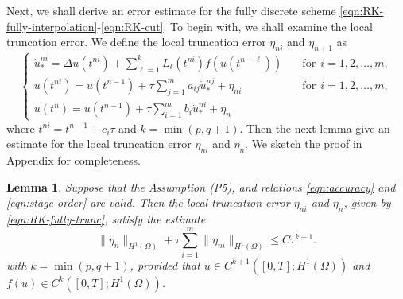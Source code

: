\documentclass[a4paper, oneside]{book}
\def\II{(\Omega)}
\newtheorem{lemma}{Lemma}[section]
\begin{document}
Next, we shall derive an error estimate for the fully discrete scheme \eqref{eqn:RK-fully-interpolation}-\eqref{eqn:RK-cut}.
To begin with, we shall examine the local truncation error. We define the local truncation error $\eta_{ni}$ and $\eta_{n+1}$  as
\begin{equation}\label{eqn:RK-fully-trunc}
    \begin{cases}
    \dot u_*^{ni} = \Delta  u(t^{ni}) +
    \sum_{\ell=1}^k L_{\ell}(t^{ni}) f(u(t^{n-\ell}))&\quad \text{for} ~~i=1,2,\dots,m, \\ %
    u(t^{ni})=  u(t^{n-1}) + \tau \sum_{j=1}^m a_{ij} \dot u_*^{nj} + \eta_{ni}&\quad \text{for} ~~i=1,2,\dots,m, \\
    u(t^n) = u(t^{n-1}) + \tau \sum_{i=1}^m b_i \dot u_*^{ni} + \eta_{n}
  \end{cases}
\end{equation}
where $t^{ni}=t^{n-1}+c_i\tau$ and $k=\min(p,q+1)$.
Then the next lemma give an estimate for the local truncation error $\eta_{ni}$ and $\eta_{n}$.
We sketch the proof in Appendix for completeness.

\begin{lemma}\label{lem:RK-local-truncation}
Suppose that the Assumption (P5), and relations \eqref{eqn:accuracy} and \eqref{eqn:stage-order}
are valid. Then the local truncation error $\eta_{ni}$ and $\eta_{n}$, given by \eqref{eqn:RK-fully-trunc},
satisfy the estimate
\begin{equation*}
\| \eta_n \|_{H^1\II}  + \tau \sum_{i=1}^m  \| \eta_{ni} \|_{H^1\II}   \le C \tau^{k+1}.
\end{equation*}
with $k=\min(p,q+1)$, provided that $u\in C^{k+1}([0,T]; H^1\II)$ and $f(u) \in C^k([0,T]; H^1\II)$.
\end{lemma}
\end{document}
